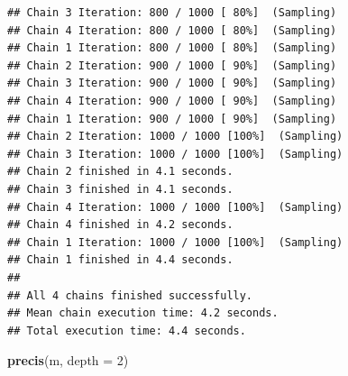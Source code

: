 \documentclass[
]{book}
\newenvironment{Shaded}{\begin{snugshade}}{\end{snugshade}}
\newcommand{\AttributeTok}[1]{\textcolor[rgb]{0.13,0.29,0.53}{#1}}
\newcommand{\DecValTok}[1]{\textcolor[rgb]{0.00,0.00,0.81}{#1}}
\newcommand{\FunctionTok}[1]{\textcolor[rgb]{0.13,0.29,0.53}{\textbf{#1}}}
\newcommand{\NormalTok}[1]{#1}
\begin{document}
\begin{verbatim}
## Chain 3 Iteration: 800 / 1000 [ 80%]  (Sampling) 
## Chain 4 Iteration: 800 / 1000 [ 80%]  (Sampling) 
## Chain 1 Iteration: 800 / 1000 [ 80%]  (Sampling) 
## Chain 2 Iteration: 900 / 1000 [ 90%]  (Sampling) 
## Chain 3 Iteration: 900 / 1000 [ 90%]  (Sampling) 
## Chain 4 Iteration: 900 / 1000 [ 90%]  (Sampling) 
## Chain 1 Iteration: 900 / 1000 [ 90%]  (Sampling) 
## Chain 2 Iteration: 1000 / 1000 [100%]  (Sampling) 
## Chain 3 Iteration: 1000 / 1000 [100%]  (Sampling) 
## Chain 2 finished in 4.1 seconds.
## Chain 3 finished in 4.1 seconds.
## Chain 4 Iteration: 1000 / 1000 [100%]  (Sampling) 
## Chain 4 finished in 4.2 seconds.
## Chain 1 Iteration: 1000 / 1000 [100%]  (Sampling) 
## Chain 1 finished in 4.4 seconds.
## 
## All 4 chains finished successfully.
## Mean chain execution time: 4.2 seconds.
## Total execution time: 4.4 seconds.
\end{verbatim}

\begin{Shaded}
\begin{Highlighting}[]
\FunctionTok{precis}\NormalTok{(m, }\AttributeTok{depth =} \DecValTok{2}\NormalTok{)}
\end{Highlighting}
\end{Shaded}
\end{document}
